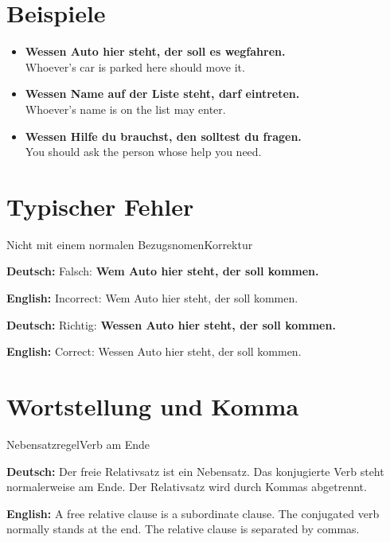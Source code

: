\documentclass[a4paper,11pt]{article}
\newcommand{\GermanText}[1]{\textbf{Deutsch: }#1\par}
\newcommand{\EnglishText}[1]{{\small\color{SoftGray}\textbf{English: }#1\par}}
\newcommand{\ExampleItem}[2]{\item \textbf{#1}\\{\small\color{SoftGray}#2}}
\begin{document}
\section{Beispiele}

\begin{exbox}

\begin{itemize}

\ExampleItem{Wessen Auto hier steht, der soll es wegfahren.}{Whoever's car is parked here should move it.}

\ExampleItem{Wessen Name auf der Liste steht, darf eintreten.}{Whoever's name is on the list may enter.}

\ExampleItem{Wessen Hilfe du brauchst, den solltest du fragen.}{You should ask the person whose help you need.}

\end{itemize}

\end{exbox}

\section{Typischer Fehler}

\begin{grammarentry}{Nicht mit einem normalen Bezugsnomen}{Korrektur}

\GermanText{Falsch: \textbf{Wem Auto hier steht, der soll kommen.}}

\EnglishText{Incorrect: Wem Auto hier steht, der soll kommen.}

\GermanText{Richtig: \textbf{Wessen Auto hier steht, der soll kommen.}}

\EnglishText{Correct: Wessen Auto hier steht, der soll kommen.}

\end{grammarentry}

\section{Wortstellung und Komma}

\begin{grammarentry}{Nebensatzregel}{Verb am Ende}

\GermanText{Der freie Relativsatz ist ein Nebensatz. Das konjugierte Verb steht normalerweise am Ende. Der Relativsatz wird durch Kommas abgetrennt.}

\EnglishText{A free relative clause is a subordinate clause. The conjugated verb normally stands at the end. The relative clause is separated by commas.}

\end{grammarentry}
\end{document}
